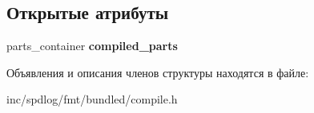 \subsection*{Открытые атрибуты}
\begin{DoxyCompactItemize}
\item 
\mbox{\label{structinternal_1_1compiled__format__base_a305c88c0ae819f5d5af4ded596da0445}} 
parts\+\_\+container {\bfseries compiled\+\_\+parts}
\end{DoxyCompactItemize}


Объявления и описания членов структуры находятся в файле\+:\begin{DoxyCompactItemize}
\item 
inc/spdlog/fmt/bundled/compile.\+h\end{DoxyCompactItemize}

